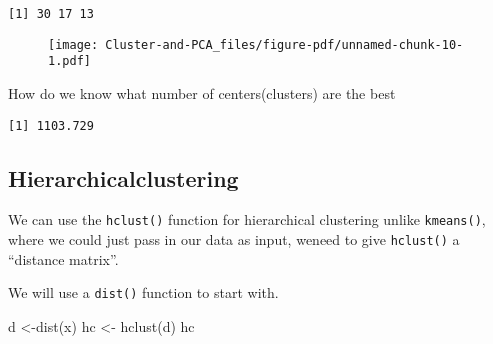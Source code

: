 \documentclass[
  letterpaper,
  DIV=11,
  numbers=noendperiod]{scrartcl}
\newenvironment{Shaded}{\begin{snugshade}}{\end{snugshade}}
\newcommand{\AttributeTok}[1]{\textcolor[rgb]{0.40,0.45,0.13}{#1}}
\newcommand{\FunctionTok}[1]{\textcolor[rgb]{0.28,0.35,0.67}{#1}}
\newcommand{\NormalTok}[1]{\textcolor[rgb]{0.00,0.23,0.31}{#1}}
\newcommand{\OtherTok}[1]{\textcolor[rgb]{0.00,0.23,0.31}{#1}}
\newcommand{\SpecialCharTok}[1]{\textcolor[rgb]{0.37,0.37,0.37}{#1}}
\begin{document}
\begin{Shaded}
\end{Shaded}

\begin{verbatim}
[1] 30 17 13
\end{verbatim}

\begin{Shaded}
\end{Shaded}

\begin{figure}[H]

{\centering \texttt{[image: Cluster-and-PCA\_files/figure-pdf/unnamed-chunk-10-1.pdf]}

}

\end{figure}

How do we know what number of centers(clusters) are the best

\begin{Shaded}
\end{Shaded}

\begin{verbatim}
[1] 1103.729
\end{verbatim}

\hypertarget{hierarchicalclustering}{%
\subsection{Hierarchicalclustering}\label{hierarchicalclustering}}

We can use the \texttt{hclust()} function for hierarchical clustering
unlike \texttt{kmeans()}, where we could just pass in our data as input,
weneed to give \texttt{hclust()} a ``distance matrix''.

We will use a \texttt{dist()} function to start with.

\begin{Shaded}
\begin{Highlighting}[]
\NormalTok{d }\OtherTok{\textless{}{-}}\FunctionTok{dist}\NormalTok{(x)}
\NormalTok{hc }\OtherTok{\textless{}{-}} \FunctionTok{hclust}\NormalTok{(d)}
\NormalTok{hc}
\end{Highlighting}
\end{Shaded}
\end{document}
